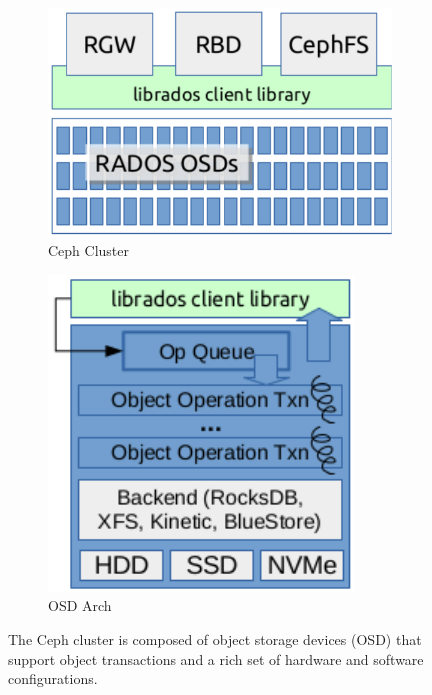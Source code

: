 \documentclass[10pt,twocolumn]{article}
\begin{document}
\begin{figure}[t]
  \centering
  \begin{subfigure}[b]{.48\linewidth}
      \centering
      \includegraphics[width=1.0\linewidth]{figures/ceph}
      \caption{Ceph Cluster}
      \label{fig:ceph}
  \end{subfigure}\quad
  \begin{subfigure}[b]{.40\linewidth}
      \centering
      \includegraphics[width=1.0\linewidth]{figures/osd}
      \caption{OSD Arch}
      \label{fig:osd}
  \end{subfigure}
  \caption{The Ceph cluster is composed of object storage devices (OSD) that
  support object transactions and a rich set of hardware and software
configurations.}
\end{figure}
\end{document}
